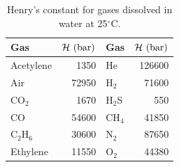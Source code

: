  \begin{table}
  \begin{center}
    \begin{tabular}{l r || l r }
      \hline
       {\bf Gas}    &  ${\bf \mathcal{H}\text{ (bar)}}$ & {\bf Gas}    &  ${\bf \mathcal{H}\text{ (bar)}}$ \\
      \hline
         Acetylene  &   1350                            & He           &  126600 \\
         Air        &   72950                           & H$_{2}$      &  71600  \\
         CO$_{2}$    & 1670                              & H$_{2}$S     & 550 \\
         CO         &  54600                            &  CH$_{4}$    &  41850 \\
         C$_{2}$H$_{6}$ & 30600                          &  N$_{2}$     & 87650  \\
         Ethylene  & 11550                              & O$_{2}$      & 44380 \\
      \hline
    \end{tabular}
    \caption{Henry's constant for gases dissolved in water at 25$^{\circ}$C.}\label{Chapter:VLE:Table:HenryLawTable}
  \end{center}
\end{table}

